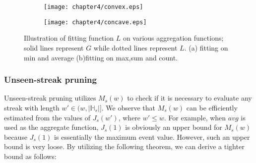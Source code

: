 \begin{figure}
	\centering
    \begin{subfigure}[b]{0.45\textwidth}
        \texttt{[image: chapter4/convex.eps]}
        \caption{}
    \end{subfigure}
    \begin{subfigure}[b]{0.45\textwidth}
        \texttt{[image: chapter4/concave.eps]}
        \caption{}
    \end{subfigure}
    \caption{Illustration of fitting function $L$ on various aggregation functions; solid lines represent $G$ while dotted lines represent $L$. (a) fitting on min and average (b)fitting on max,sum and count.}
    \label{fig:convex_exp}
\end{figure}


\subsubsection{Unseen-streak pruning}
\label{sec:useen-window-bound}
Unseen-streak pruning utilizes $M_s(w)$ to check if it is necessary to evaluate any 
streak with length $w' \in (w,|\mathbb{H}_s|]$. We observe that $M_s(w)$ can
be efficiently estimated from the values of $J_s(w')$, where $w'\leq w$. 
For example, when $avg$ is used as the aggregate function, $J_s(1)$ is obviously an upper bound for $M_s(w)$ because $J_s(1)$ is essentially the maximum event value. However, such an upper bound is very loose. By utilizing the following theorem, we can derive a tighter bound as follows:

